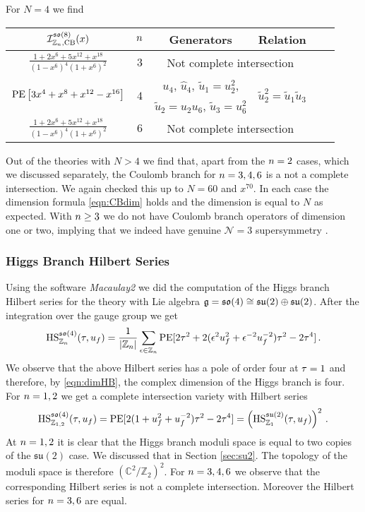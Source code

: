 \documentclass[main.tex]{subfiles}
\begin{document}
For $N=4$ we find
\begin{center}
\begin{tabular}{|c|c|c|c|c|c|}
\hline
$\mathcal{I}_{\mathbb{Z}_{n},\text{CB}}^{\mathfrak{so}(8)}(x)$&${n}$&Generators&Relation\\\hline
$\frac{1+2x^6+5x^{12}+x^{18}}{(1-x^6)^4(1+x^6)^2}$ & $3$ &\multicolumn{2}{c|}{Not complete intersection}\\\hline
\multirow{ 2}{*}{$\operatorname{\mathrm{PE}}\left[3x^4+x^{8}+x^{12}-x^{16}\right]$} & \multirow{ 2}{*}{$4$}& $u_4$, $\hat{u}_4$, $\widetilde{u}_1=u_2^2$,&\multirow{ 2}{*}{$\widetilde{u}_2^2=\widetilde{u}_1\widetilde{u}_3$}\\
&&$\widetilde{u}_2=u_2u_6$, $\widetilde{u}_3=u_6^2$&\\\hline
$\frac{1+2x^6+5x^{12}+x^{18}}{(1-x^6)^4(1+x^6)^2}$ & $6$ &\multicolumn{2}{c|}{Not complete intersection}\\\hline
\end{tabular}
\end{center}
Out of the theories with $N>4$ we find that, apart from the ${n}=2$ cases, which we discussed separately, the Coulomb branch for ${n}=3,4,6$ is a not a complete intersection. We again checked this up to $N=60$ and $x^{70}$. In each case the dimension formula \eqref{eqn:CBdim} holds and the dimension is equal to $N$ as expected. With ${n}\geq3$ we do not have Coulomb branch operators of dimension one or two, implying that we indeed have genuine $\mathcal{N}=3$ supersymmetry \cite{Aharony:2015oyb}. 

\subsubsection{Higgs Branch Hilbert Series}
Using the software \textit{Macaulay2} we did the computation of the Higgs branch Hilbert series for the theory with Lie algebra $\mathfrak{g}=\mathfrak{so}(4) \cong \mathfrak{su}(2) \oplus \mathfrak{su}(2)$. After the integration over the gauge group we get
\begin{equation}
\textrm{HS}_{\mathbb{Z}_{n}}^{\mathfrak{so}(4)}(\tau,u_f)=\frac{1}{|\mathbb{Z}_{n}|}\sum_{\epsilon \in \mathbb{Z}_{n}}\operatorname{\mathrm{PE}}[2\tau^2+2(\epsilon^2 u_f^2+\epsilon^{-2}u_f^{-2})\tau^2-2\tau^4] \, .
\end{equation}
We observe that the above Hilbert series has a pole of order four at $\tau=1$ and therefore, by \eqref{eqn:dimHB}, the complex dimension of the Higgs branch is four. 
For ${n}=1,2$ we get a complete intersection variety with Hilbert series
\begin{equation}
 \textrm{HS}_{\mathbb{Z}_{1,2}}^{\mathfrak{so}(4)}(\tau,u_f) = \textrm{PE}[2(1+u_f^2+u_f^{-2})\tau^2 -2\tau^4]= \left(\textrm{HS}_{\mathbb{Z}_1}^{\mathfrak{su}(2)}(\tau,u_f)\right)^2\, .
\end{equation}
At ${n}=1,2$ it is clear that the Higgs branch moduli space is equal to two copies of the $\mathfrak{su}(2)$ case. We discussed that in Section \ref{sec:su2}. The topology of the moduli space is therefore $\left(\mathbb{C}^2/\mathbb{Z}_2 \right)^2$. For ${n}=3,4,6$ we observe that the corresponding Hilbert series is not a complete intersection. Moreover the Hilbert series for ${n}=3,6$ are equal.
\end{document}
